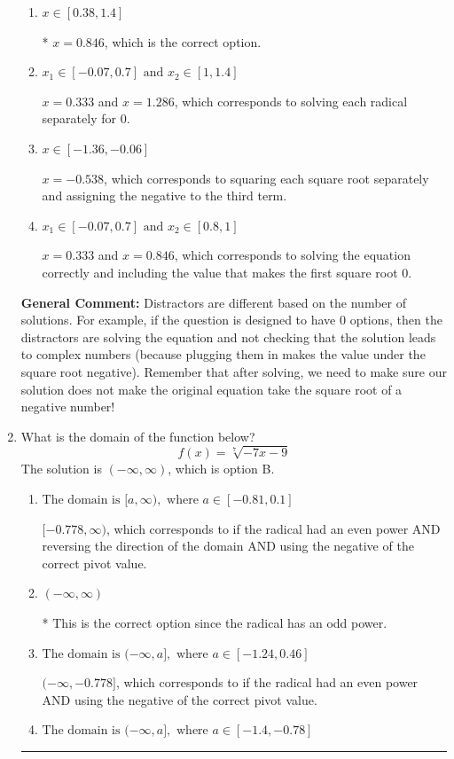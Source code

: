 \documentclass{extbook}[14pt]
\newcommand{\litem}[1]{\item #1

\rule{\textwidth}{0.4pt}}
\begin{document}
\begin{enumerate}
{\begin{enumerate}[label=\Alph*.]
This corresponds to believing the solution $x = 0.846$ leads to a complex value in the original equation.
\item \( x \in [0.38,1.4] \)

* $x = 0.846$, which is the correct option.
\item \( x_1 \in [-0.07, 0.7] \text{ and } x_2 \in [1,1.4] \)

$x = 0.333$ and $x = 1.286$, which corresponds to solving each radical separately for 0.
\item \( x \in [-1.36,-0.06] \)

$x = -0.538$, which corresponds to squaring each square root separately and assigning the negative to the third term.
\item \( x_1 \in [-0.07, 0.7] \text{ and } x_2 \in [0.8,1] \)

$x = 0.333$ and $x = 0.846$, which corresponds to solving the equation correctly and including the value that makes the first square root 0.
\end{enumerate}

\textbf{General Comment:} Distractors are different based on the number of solutions. For example, if the question is designed to have 0 options, then the distractors are solving the equation and not checking that the solution leads to complex numbers (because plugging them in makes the value under the square root negative). Remember that after solving, we need to make sure our solution does not make the original equation take the square root of a negative number!
}
\litem{
What is the domain of the function below?
\[ f(x) = \sqrt[7]{-7 x - 9} \]The solution is \( (-\infty, \infty) \), which is option B.\begin{enumerate}[label=\Alph*.]
\item \( \text{The domain is } [a, \infty), \text{   where } a \in [-0.81, 0.1] \)

$[-0.778, \infty)$, which corresponds to if the radical had an even power AND reversing the direction of the domain AND using the negative of the correct pivot value.
\item \( (-\infty, \infty) \)

* This is the correct option since the radical has an odd power.
\item \( \text{The domain is } (-\infty, a], \text{   where } a \in [-1.24, 0.46] \)

$(-\infty, -0.778]$, which corresponds to if the radical had an even power AND using the negative of the correct pivot value.
\item \( \text{The domain is } (-\infty, a], \text{   where } a \in [-1.4, -0.78] \)


\end{enumerate}}
\end{enumerate}
\end{document}

